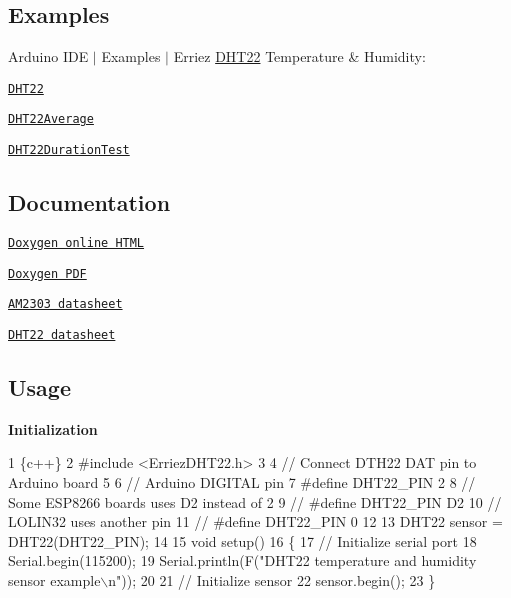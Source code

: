 \subsection*{Examples}

Arduino I\+DE $\vert$ Examples $\vert$ Erriez \hyperlink{class_d_h_t22}{D\+H\+T22} Temperature \& Humidity\+:


\begin{DoxyItemize}
\item \href{https://github.com/Erriez/ErriezDHT22/blob/master/examples/DHT22/DHT22.ino}{\tt D\+H\+T22}
\item \href{https://github.com/Erriez/ErriezDHT22/blob/master/examples/DHT22Average/DHT22Average.ino}{\tt D\+H\+T22\+Average}
\item \href{https://github.com/Erriez/ErriezDHT22/blob/master/examples/DHT22DurationTest/DHT22DurationTest.ino}{\tt D\+H\+T22\+Duration\+Test}
\end{DoxyItemize}

\subsection*{Documentation}


\begin{DoxyItemize}
\item \href{https://erriez.github.io/ErriezDHT22}{\tt Doxygen online H\+T\+ML}
\item \href{https://github.com/Erriez/ErriezDHT22/raw/gh-pages/latex/ErriezDHT22.pdf}{\tt Doxygen P\+DF}
\item \href{https://raw.githubusercontent.com/Erriez/ErriezDHT22/master/extras/AM2303_datasheet.pdf}{\tt A\+M2303 datasheet}
\item \href{https://www.google.com/search?q=DHT22+datasheet}{\tt D\+H\+T22 datasheet}
\end{DoxyItemize}

\subsection*{Usage}

{\bfseries Initialization}


\begin{DoxyCode}
1 \{c++\}
2 #include <ErriezDHT22.h>
3 
4 // Connect DTH22 DAT pin to Arduino board
5 
6 // Arduino DIGITAL pin
7 #define DHT22\_PIN      2
8 // Some ESP8266 boards uses D2 instead of 2
9 // #define DHT22\_PIN   D2
10 // LOLIN32 uses another pin
11 // #define DHT22\_PIN   0
12 
13 DHT22 sensor = DHT22(DHT22\_PIN);
14 
15 void setup()
16 \{
17     // Initialize serial port
18     Serial.begin(115200);
19     Serial.println(F("DHT22 temperature and humidity sensor example\(\backslash\)n"));
20 
21     // Initialize sensor
22     sensor.begin();
23 \}
\end{DoxyCode}


